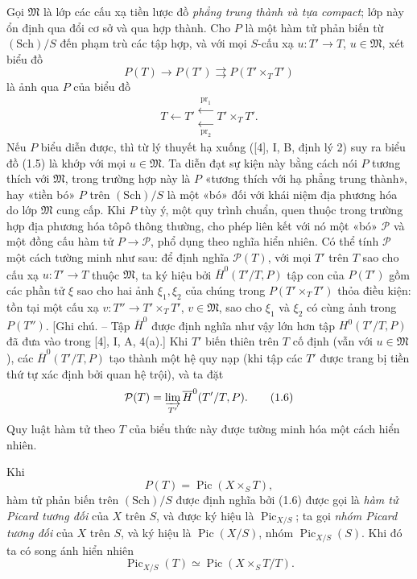 Gọi $\mathfrak M$ là lớp các cấu xạ tiền lược đồ \emph{phẳng trung thành và tựa
compact}; lớp này ổn định qua đổi cơ sở và qua hợp thành. Cho $P$ là một hàm tử
phản biến từ $(\mathrm{Sch})/S$ đến phạm trù các tập hợp, và với mọi
$S$-cấu xạ $u:T'\longrightarrow T$, $u\in\mathfrak M$, xét biểu đồ
\begin{equation}
P(T)\longrightarrow P(T')\rightrightarrows P(T'\times_TT')
\tag{1.5}
\end{equation}
là ảnh qua $P$ của biểu đồ
\[
T\longleftarrow T'\mathrel{\substack{\xleftarrow{\,\mathrm{pr}_1\,}\\[-0.35ex]
\xleftarrow[\,\mathrm{pr}_2\,]{}}}T'\times_TT'.
\]
Nếu $P$ biểu diễn được, thì từ lý thuyết hạ xuống ([4], I, B, định lý 2) suy ra
biểu đồ (1.5) là khớp với mọi $u\in\mathfrak M$. Ta diễn đạt sự kiện này bằng
cách nói $P$ tương thích với $\mathfrak M$, trong trường hợp này là $P$
«tương thích với hạ phẳng trung thành», hay «tiền bó» $P$ trên
$(\mathrm{Sch})/S$ là một «bó» đối với khái niệm địa phương hóa do lớp
$\mathfrak M$ cung cấp. Khi $P$ tùy ý, một quy trình chuẩn, quen thuộc trong
trường hợp địa phương hóa tôpô thông thường, cho phép liên kết với nó một «bó»
$\mathcal P$ và một đồng cấu hàm tử $P\longrightarrow\mathcal P$, phổ dụng
theo nghĩa hiển nhiên. Có thể tính $\mathcal P$ một cách tường minh như sau:
để định nghĩa $\mathcal P(T)$, với mọi $T'$ trên $T$ sao cho cấu xạ
$u:T'\longrightarrow T$ thuộc $\mathfrak M$, ta ký hiệu bởi
$\overline H^0(T'/T,P)$ tập con của $P(T')$ gồm các phần tử $\xi$ sao cho hai
ảnh $\xi_1,\xi_2$ của chúng trong $P(T'\times_TT')$ thỏa điều kiện: tồn tại
một cấu xạ $v:T''\longrightarrow T'\times_TT'$, $v\in\mathfrak M$, sao cho
$\xi_1$ và $\xi_2$ có cùng ảnh trong $P(T'')$. [Ghi chú. -- Tập
$\overline H^0$ được định nghĩa như vậy lớn hơn tập $H^0(T'/T,P)$ đã đưa vào
trong [4], I, A, 4(a).] Khi $T'$ biến thiên trên $T$ cố định (vẫn với
$u\in\mathfrak M$), các $\overline H^0(T'/T,P)$ tạo thành một hệ quy nạp (khi
tập các $T'$ được trang bị tiền thứ tự xác định bởi quan hệ trội), và ta đặt
\begin{equation}
\mathcal P(T)=\varinjlim_{T'}\overline H^0(T'/T,P).
\tag{1.6}
\end{equation}
Quy luật hàm tử theo $T$ của biểu thức này được tường minh hóa một cách hiển
nhiên.

Khi
\[
P(T)=\operatorname{Pic}(X\times_ST),
\]
hàm tử phản biến trên $(\mathrm{Sch})/S$ được định nghĩa bởi (1.6) được gọi là
\emph{hàm tử Picard tương đối} của $X$ trên $S$, và được ký hiệu là
$\operatorname{Pic}_{X/S}$; ta gọi \emph{nhóm Picard tương đối} của $X$ trên
$S$, và ký hiệu là $\operatorname{Pic}(X/S)$, nhóm
$\operatorname{Pic}_{X/S}(S)$. Khi đó ta có song ánh hiển nhiên
\begin{equation}
\operatorname{Pic}_{X/S}(T)\simeq\operatorname{Pic}(X\times_ST/T).
\tag{1.7}
\end{equation}

